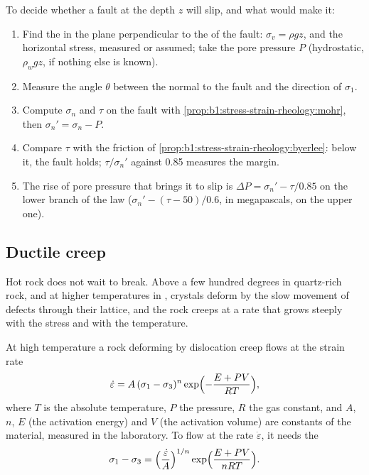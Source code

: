 \begin{method}\label{met:b1:stress-strain-rheology:slip-test}
To decide whether a fault at the depth $z$ will slip, and what would make it:
\begin{enumerate}
  \item Find the  in the plane perpendicular to the 
        of the fault: $\sigma_v = \rho g z$, and the horizontal stress, measured
        or assumed; take the pore pressure $P$ (hydrostatic, $\rho_w g z$, if
        nothing else is known).
  \item Measure the angle $\theta$ between the normal to the fault and the
        direction of $\sigma_1$.
  \item Compute $\sigma_n$ and $\tau$ on the fault with
        \cref{prop:b1:stress-strain-rheology:mohr}, then
        $\sigma_n' = \sigma_n - P$.
  \item Compare $\tau$ with the friction of
        \cref{prop:b1:stress-strain-rheology:byerlee}: below it, the fault holds;
        $\tau/\sigma_n'$ against 0.85 measures the margin.
  \item The rise of pore pressure that brings it to slip is
        $\Delta P = \sigma_n' - \tau/0.85$ on the lower branch of the law
        ($\sigma_n' - (\tau - 50)/0.6$, in megapascals, on the upper one).
\end{enumerate}
\end{method}

\subsection*{Ductile creep}

Hot rock does not wait to break. Above a few hundred degrees in quartz-rich
rock, and at higher temperatures in , crystals deform by the slow movement of defects
through their lattice, and the rock creeps at a rate that grows steeply with
the stress and with the temperature.

\begin{proposition}\label{prop:b1:stress-strain-rheology:creep}
At high temperature a rock deforming by dislocation creep flows at the strain
rate
\[
  \dot\varepsilon = A\,(\sigma_1 - \sigma_3)^n \exp\Bigl(-\frac{E + PV}{RT}\Bigr),
\]
where $T$ is the absolute temperature, $P$ the pressure, $R$ the gas
constant, and $A$, $n$, $E$ (the activation energy) and $V$ (the activation
volume) are constants of the material, measured in the laboratory. To flow at
the rate $\dot\varepsilon$, it needs the 
\[
  \sigma_1 - \sigma_3 = \Bigl(\frac{\dot\varepsilon}{A}\Bigr)^{1/n}
  \exp\Bigl(\frac{E + PV}{nRT}\Bigr).
\]
\end{proposition}
\admitted


